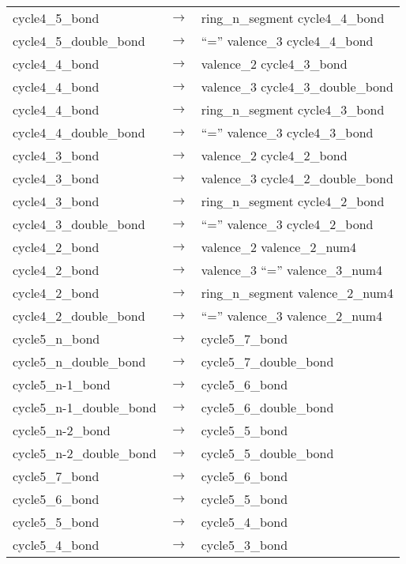 \documentclass[../Document.tex]{subfiles}
\begin{document}
\begin{longtable}{m{} p{} p{}}
    cycle4\_5\_bond & $\rightarrow$ & ring\_n\_segment cycle4\_4\_bond \\
    cycle4\_5\_double\_bond & $\rightarrow$ & ``='' valence\_3 cycle4\_4\_bond \\
    cycle4\_4\_bond & $\rightarrow$ & valence\_2 cycle4\_3\_bond \\
    cycle4\_4\_bond & $\rightarrow$ & valence\_3 cycle4\_3\_double\_bond \\
    cycle4\_4\_bond & $\rightarrow$ & ring\_n\_segment cycle4\_3\_bond \\
    cycle4\_4\_double\_bond & $\rightarrow$ & ``='' valence\_3 cycle4\_3\_bond \\
    cycle4\_3\_bond & $\rightarrow$ & valence\_2 cycle4\_2\_bond \\
    cycle4\_3\_bond & $\rightarrow$ & valence\_3 cycle4\_2\_double\_bond \\
    cycle4\_3\_bond & $\rightarrow$ & ring\_n\_segment cycle4\_2\_bond \\
    cycle4\_3\_double\_bond & $\rightarrow$ & ``='' valence\_3 cycle4\_2\_bond \\
    cycle4\_2\_bond & $\rightarrow$ & valence\_2 valence\_2\_num4 \\
    cycle4\_2\_bond & $\rightarrow$ & valence\_3 ``='' valence\_3\_num4 \\
    cycle4\_2\_bond & $\rightarrow$ & ring\_n\_segment valence\_2\_num4 \\
    cycle4\_2\_double\_bond & $\rightarrow$ & ``='' valence\_3 valence\_2\_num4 \\
    cycle5\_n\_bond & $\rightarrow$ & cycle5\_7\_bond \\
    cycle5\_n\_double\_bond & $\rightarrow$ & cycle5\_7\_double\_bond \\
    cycle5\_n-1\_bond & $\rightarrow$ & cycle5\_6\_bond \\
    cycle5\_n-1\_double\_bond & $\rightarrow$ & cycle5\_6\_double\_bond \\
    cycle5\_n-2\_bond & $\rightarrow$ & cycle5\_5\_bond \\
    cycle5\_n-2\_double\_bond & $\rightarrow$ & cycle5\_5\_double\_bond \\
    cycle5\_7\_bond & $\rightarrow$ & cycle5\_6\_bond \\
    cycle5\_6\_bond & $\rightarrow$ & cycle5\_5\_bond \\
    cycle5\_5\_bond & $\rightarrow$ & cycle5\_4\_bond \\
    cycle5\_4\_bond & $\rightarrow$ & cycle5\_3\_bond \\

\end{longtable}
\end{document}
